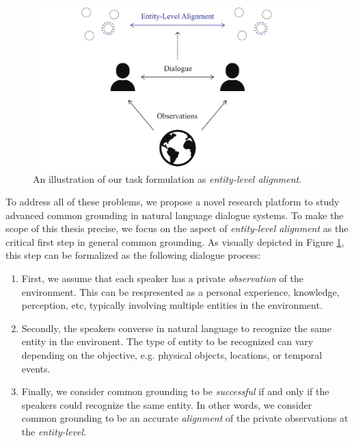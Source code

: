 \begin{figure}[t!]
\centering
\includegraphics[width=\textwidth]{entity_level_alignment.pdf}
\caption{An illustration of our task formulation as \textit{entity-level alignment}.
}
\label{01_fig:entity_level_alignment}
\end{figure}

To address all of these problems, we propose a novel research platform to study advanced common grounding in natural language dialogue systems. To make the scope of this thesis precise, we focus on the aspect of \textit{entity-level alignment} as the critical first step in general common grounding. As visually depicted in Figure \ref{01_fig:entity_level_alignment}, this step can be formalized as the following dialogue process:

\begin{enumerate}
  \item First, we assume that each speaker has a private \textit{observation} of the environment. This can be respresented as a personal experience, knowledge, perception, etc, typically involving multiple entities in the environment.

  \item Secondly, the speakers converse in natural language to recognize the same entity in the environent. The type of entity to be recognized can vary depending on the objective, e.g. physical objects, locations, or temporal events. 

  \item Finally, we consider common grounding to be \textit{successful} if and only if the speakers could recognize the same entity. In other words, we consider common grounding to be an accurate \textit{alignment} of the private observations at the \textit{entity-level}.
\end{enumerate}

